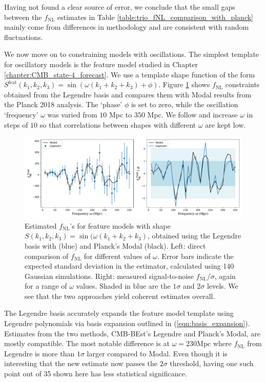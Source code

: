 Having not found a clear source of error, we conclude that the small gaps between the $f_\text{NL}$ estimates in Table \ref{table:trio_fNL_comparison_with_planck} mainly come from differences in methodology and are consistent with random fluctuations.

We now move on to constraining models with oscillations. The simplest template for oscillatory models is the feature model studied in Chapter \ref{chapter:CMB_state-4_forecast}. We use a template shape function of the form $S^\text{feat}(k_1,k_2,k_3) = \sin(\omega (k_1 + k_2 + k_3) + \phi)$. Figure \ref{fig:sine_template_frequency_Legendre_Modal} shows $f_\text{NL}$ constraints obtained from the Legendre basis and compares them with Modal results from the Planck 2018 analysis. The `phase' $\phi$ is set to zero, while the oscillation `frequency' $\omega$ was varied from $10$ Mpc to $350$ Mpc. We follow \cite{Fergusson2015a} and increase $\omega$ in steps of $10$ so that correlations between shapes with different $\omega$ are kept low.

\begin{figure}[htbp!] 
	\centering    
	\includegraphics[width=\textwidth]{sine_template_frequency_Legendre_Modal.pdf}
	\caption{Estimated $f_\text{NL}$'s for feature models with shape $S(k_1,k_2,k_3) = \sin(\omega (k_1 + k_2 + k_3)$, obtained using the Legendre basis with (blue) and Planck's Modal (black). Left: direct comparison of $f_\text{NL}$ for different values of $\omega$. Error bars indicate the expected standard deviation in the estimator, calculated using 140 Gaussian simulations. Right: measured signal-to-noise $f_\text{NL}/\sigma$, again for a range of $\omega$ values. Shaded in blue are the $1\sigma$ and $2\sigma$ levels. We see that the two approaches yield coherent estimates overall.}
	\label{fig:sine_template_frequency_Legendre_Modal}
\end{figure}

The Legendre basis accurately expands the feature model template using Legendre polynomials via basis expansion outlined in (\ref{eqn:basis_expansion}). Estimates from the two methods, CMB-BEst's Legendre and Planck's Modal, are mostly compatible. The most notable difference is at $\omega=230$Mpc where $f_\text{NL}$ from Legendre is more than $1\sigma$ larger compared to Modal. Even though it is interesting that the new estimate now passes the $2\sigma$ threshold, having one such point out of 35 shown here has less statistical significance.

